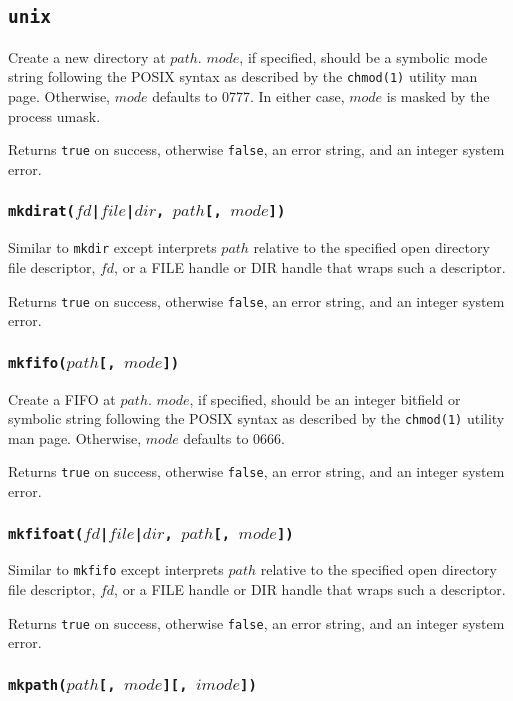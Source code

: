 \documentclass[11pt, oneside]{memoir}
\newcommand*{\true}[0]{\texttt{true}\xspace}
\newcommand*{\false}[0]{\texttt{false}\xspace}
\newcommand*{\syscall}[1]{\texttt{#1}\xspace}
\newcommand*{\fn}[1]{\texttt{#1}\xspace}
\newcounter{toccols}
\newenvironment{Module}[1]{
	\subsection{\texttt{#1}}
	\addtocontents{toc}{
		\protect\begin{multicols}{\value{toccols}}
	}
}{
	\addtocontents{toc}{\protect\end{multicols}}
}
\begin{document}
\begin{Module}{unix}
Create a new directory at $path$. $mode$, if specified, should be a symbolic mode string following the POSIX syntax as described by the \texttt{chmod(1)} utility man page. Otherwise, $mode$ defaults to 0777. In either case, $mode$ is masked by the process umask.

Returns \true on success, otherwise \false, an error string, and an integer system error.

\subsubsection[\fn{mkdirat}]{\fn{mkdirat($fd$|$file$|$dir$, $path$[, $mode$])}}

Similar to \syscall{mkdir} except interprets $path$ relative to the specified open directory file descriptor, $fd$, or a FILE handle or DIR handle that wraps such a descriptor.

Returns \true on success, otherwise \false, an error string, and an integer system error.

\subsubsection[\fn{mkfifo}]{\fn{mkfifo($path$[, $mode$])}}

Create a FIFO at $path$. $mode$, if specified, should be an integer bitfield or symbolic string following the POSIX syntax as described by the \texttt{chmod(1)} utility man page. Otherwise, $mode$ defaults to 0666.

Returns \true on success, otherwise \false, an error string, and an integer system error.

\subsubsection[\fn{mkfifoat}]{\fn{mkfifoat($fd$|$file$|$dir$, $path$[, $mode$])}}

Similar to \syscall{mkfifo} except interprets $path$ relative to the specified open directory file descriptor, $fd$, or a FILE handle or DIR handle that wraps such a descriptor.

Returns \true on success, otherwise \false, an error string, and an integer system error.

\subsubsection[\fn{mkpath}]{\fn{mkpath($path$[, $mode$][, $imode$])}}


\end{Module}
\end{document}
